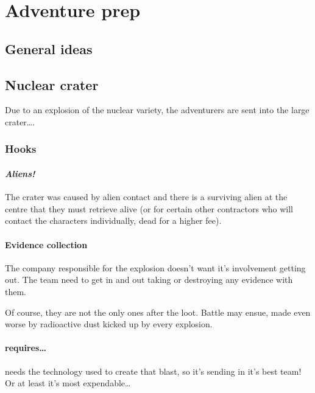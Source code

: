 \chapter{Adventure prep}
\label{cha:adventure-prep}

\section{General ideas}
\label{sec:general-ideas}

\section{Nuclear crater}
\label{sec:nuclear-crater}

Due to an explosion of the nuclear variety, the adventurers are sent into the
large crater\ldots{}.

\subsection{Hooks}
\label{sec:hooks-1}

\subsubsection{\emph{Aliens!}}
\label{sec:emphaliens}

The crater was caused by alien contact and there is a surviving alien at the
centre that they must retrieve alive (or for certain other contractors who will
contact the characters individually, dead for a higher fee).

\subsubsection{Evidence collection}
\label{sec:evidence-collection}

The company responsible for the explosion doesn't want it's involvement getting
out. The team need to get in and out taking or destroying any evidence with
them.

Of course, they are not the only ones after the loot. Battle may ensue, made
even worse by radioactive dust kicked up by every explosion.

\subsubsection{\thecompany requires\ldots{}}
\label{sec:thec-requ}

\thecompany needs the technology used to create that blast, so it's sending in
it's best team! Or at least it's most expendable\ldots{}

